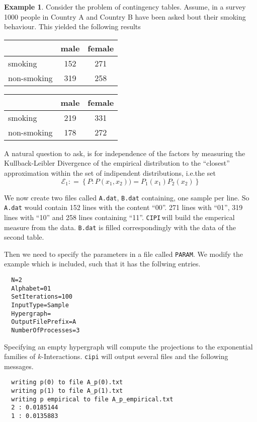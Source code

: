 \documentclass[12pt]{amsart}
\newcommand{\set}[1]{\left\lbrace #1 \right\rbrace} %
\newcommand{\defas}{\mathrel{\mathop{:}}=}   %
\newcommand{\ie}{i.e.\;}  %
\newcommand{\cipi}{\texttt{CIPI}\,}
\theoremstyle{plain}%
\theoremstyle{definition}
\newtheorem{exmp}[thm]{Example}
\theoremstyle{remark}
\begin{document}
\begin{exmp}
  Consider the problem of contingency tables. Assume, in a survey 1000 people in
  Country A and Country B have been asked bout their smoking behaviour. This
  yielded the following results
  \begin{center}
  \begin{tabular}[]{|l|c|c|}
    \hline
    & male & female \\
    \hline
    smoking & 152 & 271 \\
    non-smoking & 319 & 258\\
    \hline
  \end{tabular}\hspace{1cm}
  \begin{tabular}[]{|l|c|c|}
    \hline
    & male & female \\
    \hline
    smoking & 219 & 331 \\
    non-smoking & 178 & 272\\
    \hline
  \end{tabular}
\end{center}

  A natural question to ask, is for independence of the factors by
  measuring the Kullback-Leibler Divergence of the empirical distribution to the
  ``closest'' approximation within the set of indipendent distributions, \ie the
  set 
  \begin{equation*}
    \mathcal{E}_1 \defas \set{P : P\left( x_1,x_2 \right)) = P_1(x_1)P_2(x_2)}
  \end{equation*}

  We now create two files called \texttt{A.dat}, \texttt{B.dat} 
  containing, one sample per line. So \texttt{A.dat} would contain 152 lines
  with the content ``00''. 271 lines with ``01'', 319 lines with ``10'' and 258
  lines containing ``11''. \cipi will build the emperical measure from the data.
  \texttt{B.dat} is filled correspondingly with the data of the second table. 

  Then we need to specify the parameters in a file called \texttt{PARAM}. We
  modify the example which is included, such that it has the follwing entries.
  \begin{verbatim}
  N=2
  Alphabet=01
  SetIterations=100
  InputType=Sample
  Hypergraph=
  OutputFilePrefix=A
  NumberOfProcesses=3
  \end{verbatim}
  Specifying an empty hypergraph will compute the projections to the exponential
  families of $k$-Interactions. \texttt{cipi} will output several files and the
  following messages.
  \begin{verbatim}
  writing p(0) to file A_p(0).txt
  writing p(1) to file A_p(1).txt
  writing p empirical to file A_p_empirical.txt
  2 : 0.0185144
  1 : 0.0135883


\end{verbatim}
\end{exmp}
\end{document}
